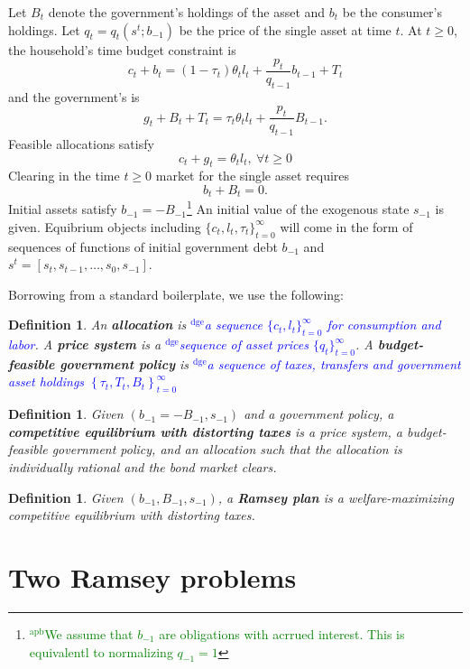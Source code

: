 \documentclass[12pt]{article}
\newcommand{\dge}[1]{\textcolor{blue}{$^{\textrm{dge}}${#1}}}
\newcommand{\apb}[1]{\textcolor{green}{$^{\textrm{apb}}${#1}}}
\newtheorem{definition}[theorem]{Definition}
\begin{document}
Let $B_t$ denote the government's holdings of the asset and $b_t$ be the consumer's holdings.
Let $q_t= q_t(s^t; b_{-1})$ be the price of the single  asset at time $t$.
 At $t \geq 0$, the household's time budget constraint is
\[ c_{t}+b_{t}=\left( 1-\tau _{t}\right) \theta _{t}l_{t}+\frac{p_{t}}{q_{t-1}}b_{t-1}+T_{t}\] %
 and the government's is
\[g_{t}+B_{t}+T_t=\tau _{t}\theta_{t}l_{t}+\frac{p_{t}}{q_{t-1}}B_{t-1}. \]
Feasible allocations satisfy
 \[c_{t}+g_t = \theta _{t} l_{t}, \ \forall t \geq 0 \]
Clearing in the time $t \geq 0$ market for the single asset requires
\[b_{t}+B_{t}=0. \]
Initial assets satisfy $b_{-1}=-B_{-1}$\footnote{\apb{We assume that $b_{-1}$ are obligations with acrrued interest. This is equivalentl to normalizing $q_{-1}=1$}} An initial value of the exogenous state  $s_{-1}$ is given.
Equibrium objects including $\{c_t, l_t, \tau_t\}_{t=0}^\infty$ will come in the form of sequences of functions of  initial government debt  $b_{-1}$ and  $s^t = [s_t, s_{t-1}, \ldots, s_0, s_{-1}]$.


Borrowing from a standard boilerplate, we use the following:

\begin{definition}
An \textbf{allocation} is \dge{a sequence $\{c_t,l_t\}_{t=0}^\infty$ for consumption and labor}. A \textbf{price system} is a \dge{sequence of asset prices $\{q_t\}_{t=0}^\infty$}.  A \textbf{budget-feasible government policy} is \dge{a sequence of taxes, transfers and government asset holdings $\left\{ \tau _{t},T_{t},B_t\right\} _{t=0}^{\infty }$}
\end{definition}

\begin{definition}
Given  $\left(b_{-1}=-B_{-1},s_{-1}\right) $ and a government policy,  a \textbf{competitive equilibrium
with distorting taxes} is a price system, a budget-feasible government policy, and an allocation such that
the allocation is individually rational and the bond  market clears.
\end{definition}

\begin{definition}
Given $\left( b_{-1},B_{-1},s_{-1}\right) $, a \textbf{Ramsey plan} is a welfare-maximizing competitive
equilibrium with distorting taxes.
\end{definition}


\section{Two Ramsey problems}
\end{document}
